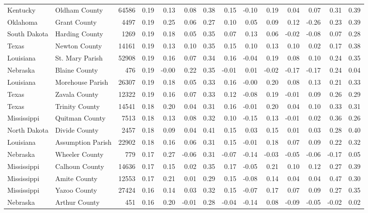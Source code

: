 \documentclass[10pt, letterpaper]{article}
\begin{document}
\begin{spacing}{1.4}
\begin{table}
{\begin{tabular}{llrrrrrrrrrrrr}
Kentucky & Oldham County & 64586 & 0.19 & 0.13 & 0.08 & 0.38 & 0.15 & -0.10 & 0.19 & 0.04 & 0.07 & 0.31 & 0.39 \\
Oklahoma & Grant County & 4497 & 0.19 & 0.25 & 0.06 & 0.27 & 0.10 & 0.05 & 0.09 & 0.12 & -0.26 & 0.23 & 0.39 \\
South Dakota & Harding County & 1269 & 0.19 & 0.18 & 0.05 & 0.35 & 0.07 & 0.13 & 0.06 & -0.02 & -0.08 & 0.07 & 0.28 \\
Texas & Newton County & 14161 & 0.19 & 0.13 & 0.10 & 0.35 & 0.15 & 0.10 & 0.13 & 0.10 & 0.02 & 0.17 & 0.38 \\
Louisiana & St. Mary Parish & 52908 & 0.19 & 0.16 & 0.07 & 0.34 & 0.16 & -0.04 & 0.19 & 0.08 & 0.10 & 0.24 & 0.35 \\
Nebraska & Blaine County & 476 & 0.19 & -0.00 & 0.22 & 0.35 & -0.01 & 0.01 & -0.02 & -0.17 & -0.17 & 0.24 & 0.04 \\
Louisiana & Morehouse Parish & 26307 & 0.19 & 0.18 & 0.05 & 0.33 & 0.16 & -0.00 & 0.20 & 0.08 & 0.13 & 0.21 & 0.33 \\
Texas & Zavala County & 12322 & 0.19 & 0.16 & 0.07 & 0.33 & 0.12 & -0.08 & 0.19 & -0.01 & 0.09 & 0.26 & 0.29 \\
Texas & Trinity County & 14541 & 0.18 & 0.20 & 0.04 & 0.31 & 0.16 & -0.01 & 0.20 & 0.04 & 0.10 & 0.33 & 0.31 \\
Mississippi & Quitman County & 7513 & 0.18 & 0.13 & 0.08 & 0.32 & 0.10 & -0.15 & 0.13 & -0.01 & 0.02 & 0.36 & 0.26 \\
North Dakota & Divide County & 2457 & 0.18 & 0.09 & 0.04 & 0.41 & 0.15 & 0.03 & 0.15 & 0.01 & 0.03 & 0.28 & 0.40 \\
Louisiana & Assumption Parish & 22902 & 0.18 & 0.16 & 0.06 & 0.31 & 0.15 & -0.01 & 0.18 & 0.07 & 0.09 & 0.22 & 0.32 \\
Nebraska & Wheeler County & 779 & 0.17 & 0.27 & -0.06 & 0.31 & -0.07 & -0.14 & -0.03 & -0.05 & -0.06 & -0.17 & 0.05 \\
Mississippi & Calhoun County & 14636 & 0.17 & 0.15 & 0.02 & 0.35 & 0.17 & -0.05 & 0.21 & 0.10 & 0.12 & 0.27 & 0.39 \\
Mississippi & Amite County & 12553 & 0.17 & 0.21 & 0.01 & 0.29 & 0.15 & -0.08 & 0.14 & 0.04 & 0.04 & 0.47 & 0.30 \\
Mississippi & Yazoo County & 27424 & 0.16 & 0.14 & 0.03 & 0.32 & 0.15 & -0.07 & 0.17 & 0.07 & 0.09 & 0.27 & 0.35 \\
Nebraska & Arthur County & 451 & 0.16 & 0.20 & -0.01 & 0.28 & -0.04 & -0.14 & 0.08 & -0.09 & -0.05 & -0.02 & 0.02 \\

\end{tabular}}
\end{table}
\end{spacing}
\end{document}
